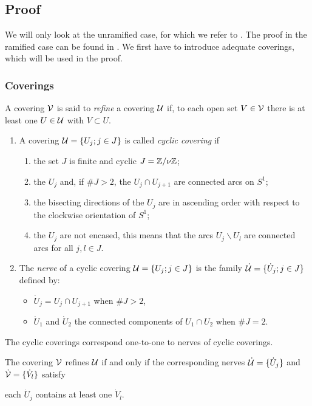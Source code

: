 \subsection{Proof}\label{sec:proofOfMatrixThm}
We will only look at the unramified case, for which we refer to
\cite[Sec.II.3]{Loday1994}.
The proof in the ramified case can be found in \cite[Sec.II.4]{Loday1994}.
We first have to introduce adequate coverings, which will be used in the proof.

\subsubsection{Coverings}
A covering $\mathcal{V}$ is said to \emph{refine} a covering $\mathcal{U}$ if, to each open set
$V\in\mathcal{V}$ there is at least one $U\in\mathcal{U}$ with $V\subset U$.
\begin{defn}
  \begin{enumerate}
    \item A covering $\mathcal{U}=\{U_j;j\in J\}$ is called \emph{cyclic covering} if
      \begin{enumerate}
        \item the set $J$ is finite and cyclic $J=\mathbb{Z}/\nu\mathbb{Z}$;
        \item the $U_j$ and, if $\#J>2$, the $U_j\cap U_{j+1}$ are connected
          arcs on $S^1$;
        \item the bisecting directions of the $U_j$ are in ascending order with
          respect to the clockwise orientation of $S^1$;
        \item the $U_j$ are not encased, this means that the arcs
          $U_j\backslash U_l$ are connected arcs for all $j,l\in J$.
      \end{enumerate}
    \item The \emph{nerve} of a cyclic covering $\mathcal{U}=\{U_j;j\in J\}$ is the
      family $\dot{\mathcal{U}}=\{\dot U_j;j\in J\}$ defined by:
      \begin{itemize}
        \item $\dot U_j=U_j\cap U_{j+1}$ when $\#J>2$,
        \item $\dot U_1$ and $\dot U_2$ the connected components of
          $U_1\cap U_2$ when $\#J=2$.
      \end{itemize}
  \end{enumerate}
\end{defn}
The cyclic coverings correspond one-to-one to nerves of cyclic coverings.
\begin{prop}
  The covering $\mathcal{V}$ refines $\mathcal{U}$ if and only if the corresponding nerves
  $\dot{\mathcal{U}}=\{\dot U_j\}$ and $\dot{\mathcal{V}}=\{\dot V_l\}$ satisfy
  \begin{einr}
    each $\dot U_j$ contains at least one $\dot V_l$.
  \end{einr}
\end{prop}

